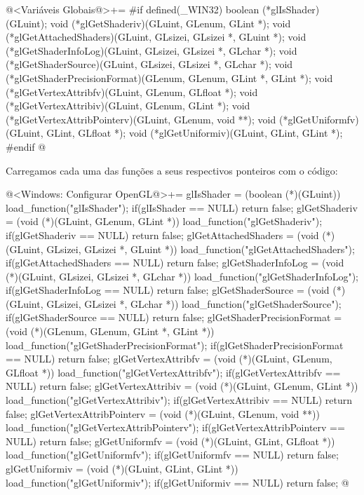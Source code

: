 \iniciocodigo
@<Variáveis Globais@>+=
#if defined(_WIN32)
boolean (*glIsShader)(GLuint);
void (*glGetShaderiv)(GLuint, GLenum, GLint *);
void (*glGetAttachedShaders)(GLuint, GLsizei, GLsizei *, GLuint *);
void (*glGetShaderInfoLog)(GLuint, GLsizei, GLsizei *, GLchar *);
void (*glGetShaderSource)(GLuint, GLsizei, GLsizei *, GLchar *);
void (*glGetShaderPrecisionFormat)(GLenum, GLenum, GLint *, GLint *);
void (*glGetVertexAttribfv)(GLuint, GLenum, GLfloat *);
void (*glGetVertexAttribiv)(GLuint, GLenum, GLint *);
void (*glGetVertexAttribPointerv)(GLuint, GLenum, void **);
void (*glGetUniformfv)(GLuint, GLint, GLfloat *);
void (*glGetUniformiv)(GLuint, GLint, GLint *);
#endif
@
\fimcodigo

Carregamos cada uma das funções a seus respectivos ponteiros com o
código:

\iniciocodigo
@<Windows: Configurar OpenGL@>+=
glIsShader = (boolean (*)(GLuint)) load_function("glIsShader");
if(glIsShader == NULL) return false;
glGetShaderiv = (void (*)(GLuint, GLenum, GLint *))
                   load_function("glGetShaderiv");
if(glGetShaderiv == NULL) return false;
glGetAttachedShaders = (void (*)(GLuint, GLsizei, GLsizei *, GLuint *))
                         load_function("glGetAttachedShaders");
if(glGetAttachedShaders == NULL) return false;
glGetShaderInfoLog = (void (*)(GLuint, GLsizei, GLsizei *, GLchar *))
                         load_function("glGetShaderInfoLog");
if(glGetShaderInfoLog == NULL)  return false;
glGetShaderSource = (void (*)(GLuint, GLsizei, GLsizei *, GLchar *))
                       load_function("glGetShaderSource");
if(glGetShaderSource == NULL) return false;
glGetShaderPrecisionFormat = (void (*)(GLenum, GLenum, GLint *, GLint *))
                                load_function("glGetShaderPrecisionFormat");
if(glGetShaderPrecisionFormat == NULL) return false;
glGetVertexAttribfv = (void (*)(GLuint, GLenum, GLfloat *))
                         load_function("glGetVertexAttribfv");
if(glGetVertexAttribfv == NULL) return false;
glGetVertexAttribiv = (void (*)(GLuint, GLenum, GLint *))
                        load_function("glGetVertexAttribiv");
if(glGetVertexAttribiv == NULL) return false;
glGetVertexAttribPointerv = (void (*)(GLuint, GLenum, void **))
                               load_function("glGetVertexAttribPointerv");
if(glGetVertexAttribPointerv == NULL) return false;
glGetUniformfv = (void (*)(GLuint, GLint, GLfloat *))
                     load_function("glGetUniformfv");
if(glGetUniformfv == NULL) return false;
glGetUniformiv = (void (*)(GLuint, GLint, GLint *))
                     load_function("glGetUniformiv");
if(glGetUniformiv == NULL) return false;
@
\fimcodigo

